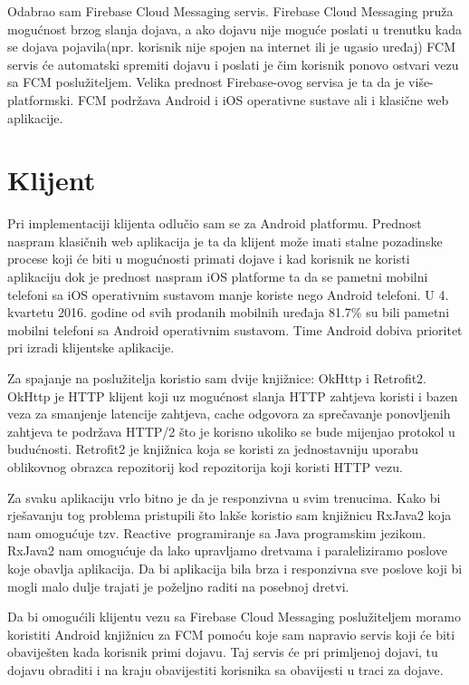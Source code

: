 \documentclass[times, utf8, zavrsni]{fer}
\begin{document}
Odabrao sam Firebase Cloud Messaging servis. Firebase Cloud Messaging pruža mogućnost brzog slanja dojava, a ako dojavu nije moguće poslati u trenutku kada se dojava pojavila(npr. korisnik nije spojen na internet ili je ugasio uređaj) FCM servis će automatski spremiti dojavu i poslati je čim korisnik ponovo ostvari vezu sa FCM poslužiteljem. Velika prednost Firebase-ovog servisa je ta da je više-platformski. FCM podržava Android i iOS operativne sustave ali i klasične web aplikacije.

\section{Klijent}

Pri implementaciji klijenta odlučio sam se za Android platformu. Prednost naspram klasičnih web aplikacija je ta da klijent može imati stalne pozadinske procese koji će biti u mogućnosti primati dojave i kad korisnik ne koristi aplikaciju dok je prednost naspram iOS platforme ta da se pametni mobilni telefoni sa iOS operativnim sustavom manje koriste nego Android telefoni. U 4. kvartetu 2016. godine od svih prodanih mobilnih uređaja 81.7\% su bili pametni mobilni telefoni sa Android operativnim sustavom. Time Android dobiva prioritet pri izradi klijentske aplikacije.

Za spajanje na poslužitelja koristio sam dvije knjižnice: OkHttp i Retrofit2. OkHttp je HTTP klijent koji uz mogućnost slanja HTTP zahtjeva koristi i bazen veza za smanjenje latencije zahtjeva, cache odgovora za sprečavanje ponovljenih zahtjeva te podržava HTTP/2 što je korisno ukoliko se bude mijenjao protokol u budućnosti. Retrofit2 je knjižnica koja se koristi za jednostavniju uporabu oblikovnog obrazca repozitorij kod repozitorija koji koristi HTTP vezu.

Za svaku aplikaciju vrlo bitno je da je responzivna u svim trenucima. Kako bi rješavanju tog problema pristupili što lakše koristio sam knjižnicu RxJava2 koja nam omogućuje tzv. \glqq Reactive\grqq\  programiranje sa Java programskim jezikom. RxJava2 nam omogućuje da lako upravljamo dretvama i paraleliziramo poslove koje obavlja aplikacija. Da bi aplikacija bila brza i responzivna sve poslove koji bi mogli malo dulje trajati je poželjno raditi na posebnoj dretvi.

Da bi omogućili klijentu vezu sa Firebase Cloud Messaging poslužiteljem moramo koristiti Android knjižnicu za FCM pomoću koje sam napravio servis koji će biti obaviješten kada korisnik primi dojavu. Taj servis će pri primljenoj dojavi, tu dojavu obraditi i na kraju obavijestiti korisnika sa obavijesti u traci za dojave.
\end{document}
